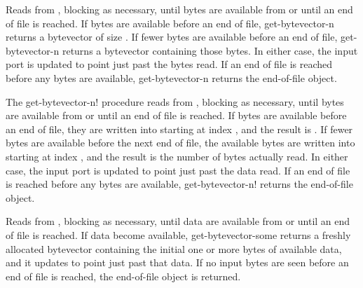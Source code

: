 \begin{entry}{%
}
   

Reads from , blocking as necessary, until 
bytes are available from  or until an end of file is
reached. If  bytes are available before an end
of file, {\cf get-bytevector-n} returns a bytevector of size .
If fewer bytes are available before an end of file, {\cf get-bytevector-n}
returns a bytevector
containing those bytes. In either case, the input port is updated to
point just past the bytes read.  If an end of file is reached before
any bytes are available, {\cf get-bytevector-n} returns the end-of-file object.
\end{entry}

\begin{entry}{%
}

   
The {\cf get-bytevector-n!} procedure reads from ,
blocking as necessary, until
 bytes are available from  or until
an end of file is
reached. If  bytes are available before an end of file,
they are written into  starting at index , and
the result is . If fewer bytes are available before
the next end of file, the available bytes are written into 
starting at index , and the result is the number of bytes actually
read. In either case, the input port is updated to point just past the
data read. If an end of file is reached before any bytes
are available, {\cf get-bytevector-n!} returns the end-of-file object.
\end{entry}

\begin{entry}{%
}
   
Reads from , blocking as necessary, until data are
available from  or until an end of file is reached.
If data become available,
{\cf get-bytevector-some} returns a freshly allocated
bytevector containing the initial one or more bytes of available
data, and it updates  to point just past that data.
If no input bytes are seen before an end
of file is reached, the end-of-file object is returned.
\end{entry}

